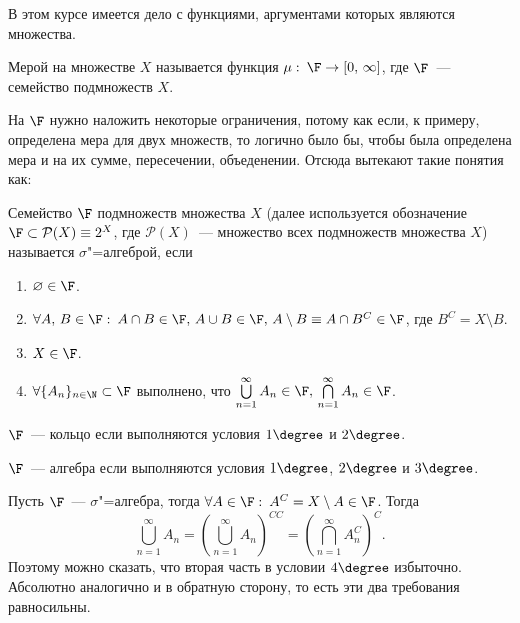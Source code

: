 \newpage
{}

В этом курсе имеется дело с функциями, аргументами которых являются множества.
\begin{definition}
	Мерой на множестве $X$ называется функция 
	$\mu:\: \F \rightarrow [0,\, \infty]$, где $\F$~--- семейство подмножеств $X$.
\end{definition}

На $\F$ нужно наложить некоторые ограничения, потому как если, к примеру, определена мера для двух множеств,
то логично было бы, чтобы была определена мера и на их сумме, пересечении, объеденении. Отсюда вытекают такие понятия как:

\begin{definition}
	Семейство $\F$ подмножеств множества $X$ (далее используется обозначение $\F \subset \mathcal{P} (X)\equiv 2^{X}$, где 
	$\mathcal{P} (X)$~--- множество всех подмножеств множества $X$) называется $\sigma$"=алгеброй, если 
	\begin{enumerate}[label=\arabic*\degree.]
		\item $\varnothing\in \F$.
		\item $\forall A,\, B\in\F:\: A\cap B\in\F,\,A\cup B\in\F,\, A\setminus B\equiv A\cap B^C\in\F$, где 
		$B^C=X\setminus B$.
		\item $X\in\F$.
		\item $\forall \{A_n\}_{n\in\N}\subset\F$ выполнено, что 
		$\bigcup\limits_{n=1}^{\infty}A_n\in\F,\,\bigcap\limits_{n=1}^{\infty}A_n\in\F$.
	\end{enumerate}
\end{definition}

\begin{definition}
	$\F$~--- кольцо если выполняются условия $1\degree$ и $2\degree$.
\end{definition}
\begin{definition}
	$\F$~--- алгебра если выполняются условия $1\degree$, $2\degree$ и $3\degree$.
\end{definition}

\begin{remark}
	Пусть $\F$~--- $\sigma$"=алгебра, тогда $\forall A\in\F:\: A^C=X\setminus A\in\F$. Тогда 
	\[
		\bigcup\limits_{n=1}^{\infty}A_n=\left(\bigcup\limits_{n=1}^{\infty}A_n\right)^{CC}=
		\left(\bigcap\limits_{n=1}^{\infty}A_n^C\right)^C.
	\] 
	Поэтому можно сказать, что вторая часть в условии $4\degree$ избыточно. Абсолютно аналогично и в обратную сторону,
	то есть эти два требования равносильны.
\end{remark}

